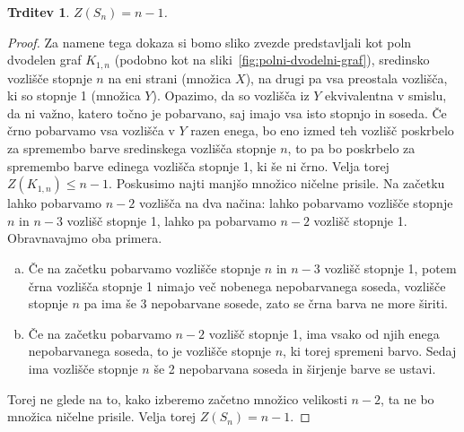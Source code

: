 \documentclass[12pt,a4paper,twoside]{article}
\theoremstyle{definition} %
\theoremstyle{plain} %
\newtheorem{trditev}[definicija]{Trditev}
\numberwithin{equation}{section}  %
\begin{document}
\begin{trditev}
    $Z(S_n) = n - 1$.
\end{trditev}
\begin{proof}
    Za namene tega dokaza si bomo sliko zvezde predstavljali kot poln dvodelen graf $K_{1,n}$ (podobno kot na sliki~\ref{fig:polni-dvodelni-graf}), sredinsko vozlišče stopnje $n$ na eni strani (množica $X$), na drugi pa vsa preostala vozlišča, ki so stopnje 1 (množica $Y$).
    Opazimo, da so vozlišča iz $Y$ ekvivalentna v smislu, da ni važno, katero točno je pobarvano, saj imajo vsa isto stopnjo in soseda. Če črno pobarvamo vsa vozlišča v $Y$ razen enega, bo eno izmed teh vozlišč poskrbelo za spremembo barve sredinskega vozlišča stopnje $n$, to pa bo poskrbelo za spremembo barve edinega vozlišča stopnje 1, ki še ni črno. Velja torej $Z(K_{1,n}) \leq n-1$. Poskusimo najti manjšo množico ničelne prisile. Na začetku lahko pobarvamo $n-2$ vozlišča na dva načina: lahko pobarvamo vozlišče stopnje $n$ in $n-3$ vozlišč stopnje 1, lahko pa pobarvamo $n-2$ vozlišč stopnje 1. Obravnavajmo oba primera.
    \begin{enumerate}[a)]
        \item Če na začetku pobarvamo vozlišče stopnje $n$ in $n-3$ vozlišč stopnje 1, potem črna vozlišča stopnje 1 nimajo več nobenega nepobarvanega soseda, vozlišče stopnje $n$ pa ima še 3 nepobarvane sosede, zato se črna barva ne more širiti. 
        \item Če na začetku pobarvamo $n-2$ vozlišč stopnje 1, ima vsako od njih enega nepobarvanega soseda, to je vozlišče stopnje $n$, ki torej spremeni barvo. Sedaj ima vozlišče stopnje $n$ še 2 nepobarvana soseda in širjenje barve se ustavi.
    \end{enumerate}
    Torej ne glede na to, kako izberemo začetno množico velikosti $n-2$, ta ne bo množica ničelne prisile. Velja torej $Z(S_n) = n-1$.
\end{proof}
\end{document}
